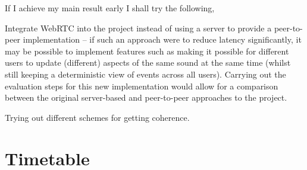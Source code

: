 \documentclass[12pt,a4paper,twoside]{article}
\begin{document}
If I achieve my main result early I shall try the following,

Integrate WebRTC into the project instead of using a server to provide a peer-to-peer implementation -- if such an approach were to reduce latency significantly, it may be possible to implement features such as making it possible for different users to update (different) aspects of the same sound at the same time (whilst still keeping a deterministic view of events across all users).
Carrying out the evaluation steps for this new implementation would allow for a comparison between the original server-based and peer-to-peer approaches to the project.

Trying out different schemes for getting coherence.


\section*{Timetable}
\end{document}
